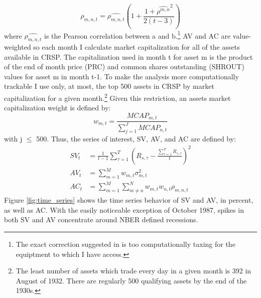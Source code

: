 \begin{equation}
	\rho_{m,n,t} = \widehat{\rho_{m,n,t}}\left(1 + \frac{1+\widehat{\rho^{m,n}}^{2}}{2(t-3)}\right)
\end{equation}
where $\widehat{\rho_{m,n,t}}$ is the Pearson correlation between a and b.\footnote{The exact correction suggested in \cite{olkin_1958} is too computationally taxing for the equiptment to which I have access.} AV and AC are value-weighted so each month I calculate market capitalization for all of the assets available in CRSP. The capitalization used in month t for asset m is the product of the end of month price (PRC) and common shares outstanding (SHROUT) values for asset m in month t-1. 
To make the analysis more computationally trackable I use only, at most, the top 500 assets in CRSP by market capitalization for a given month.\footnote{The least number of assets which trade every day in a given month is 392 in August of 1932. There are regularly 500 qualifying assets by the end of the 1930s.} Given this restriction, an assets market capitalization weight is defined by:
\begin{equation}
w_{m,t} = \frac{MCAP_{m,t}}{\sum_{j=1}^{J}MCAP_{n,t}}
\end{equation}
with j $\leq$ 500. Thus, the series of interest, SV, AV, and AC are defined by:
\begin{align}
	SV_{t} &= \frac{1}{t-1}\sum_{\tau = 1}^{T} \left(R_{s,\tau} - \frac{\sum_{\tau = 1}^{T} R_{s,\tau}}{t}\right)^{2}\\
	AV_{t} &= \sum_{m=1}^{M} w_{m,t}\sigma^{2}_{m,t}\\
	AC_{t} &= \sum_{m=1}^{M}\sum_{m \neq n}^{N}w_{m,t}w_{n,t}\rho_{m,n,t}
\end{align}
Figure \ref{fig:time_series} shows the time series behavior of SV and AV, in percent, as well as
AC. With the easily noticeable exception of October 1987, spikes in both SV and AV concentrate around NBER defined recessions.

